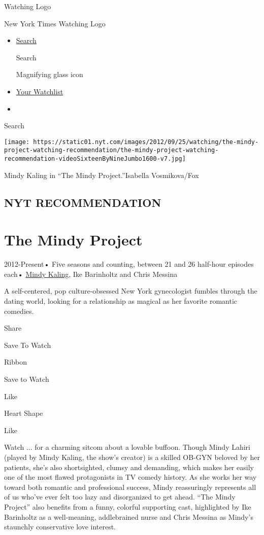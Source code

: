 \href{/watching}{}

Watching Logo

New York Times Watching Logo

\begin{itemize}
\item
  \href{/watching/search}{Search}

  Search

  Magnifying glass icon
\item
  \href{/watching/watchlist}{Your Watchlist}
\item
\end{itemize}

Search

\texttt{[image: https://static01.nyt.com/images/2012/09/25/watching/the-mindy-project-watching-recommendation/the-mindy-project-watching-recommendation-videoSixteenByNineJumbo1600-v7.jpg]}

Mindy Kaling in ``The Mindy Project.''Isabella Vosmikova/Fox

\hypertarget{nyt-recommendation}{%
\subsection{NYT RECOMMENDATION}\label{nyt-recommendation}}

\hypertarget{the-mindy-project}{%
\section{The Mindy Project}\label{the-mindy-project}}

2012-Present• Five seasons and counting, between 21 and 26 half-hour
episodes each•
\href{/watching/search?q=Mindy\%20Kaling\&actor=mindy-kaling}{Mindy
Kaling}, Ike Barinholtz and Chris Messina

A self-centered, pop culture-obsessed New York gynecologist fumbles
through the dating world, looking for a relationship as magical as her
favorite romantic comedies.

Share

Save To Watch

Ribbon

Save to Watch

Like

Heart Shape

Like

Watch ... for a charming sitcom about a lovable buffoon. Though Mindy
Lahiri (played by Mindy Kaling, the show's creator) is a skilled OB-GYN
beloved by her patients, she's also shortsighted, clumsy and demanding,
which makes her easily one of the most flawed protagonists in TV comedy
history. As she works her way toward both romantic and professional
success, Mindy reassuringly represents all of us who've ever felt too
lazy and disorganized to get ahead. ``The Mindy Project'' also benefits
from a funny, colorful supporting cast, highlighted by Ike Barinholtz as
a well-meaning, addlebrained nurse and Chris Messina as Mindy's
staunchly conservative love interest.

